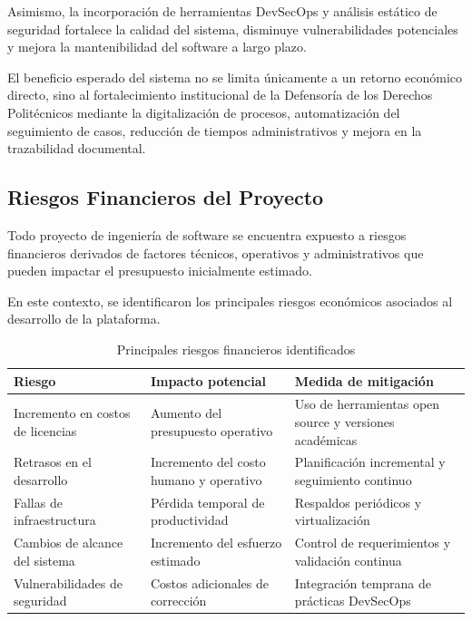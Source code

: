 \documentclass[12pt,oneside,letterpaper]{book}
\begin{document}
Asimismo, la incorporación de herramientas DevSecOps y análisis estático de seguridad fortalece la calidad del sistema, disminuye vulnerabilidades potenciales y mejora la mantenibilidad del software a largo plazo.

El beneficio esperado del sistema no se limita únicamente a un retorno económico directo, sino al fortalecimiento institucional de la Defensoría de los Derechos Politécnicos mediante la digitalización de procesos, automatización del seguimiento de casos, reducción de tiempos administrativos y mejora en la trazabilidad documental.

\vspace{0.5cm}

\subsection{Riesgos Financieros del Proyecto}

Todo proyecto de ingeniería de software se encuentra expuesto a riesgos financieros derivados de factores técnicos, operativos y administrativos que pueden impactar el presupuesto inicialmente estimado.

En este contexto, se identificaron los principales riesgos económicos asociados al desarrollo de la plataforma.

\begin{table}[H]
\centering
\caption{Principales riesgos financieros identificados}

\begin{tabular}{p{5cm} p{5cm} p{4cm}}
\toprule
\rowcolor{headerblue}
\textbf{Riesgo} & \textbf{Impacto potencial} & \textbf{Medida de mitigación} \\
\midrule

Incremento en costos de licencias &
Aumento del presupuesto operativo &
Uso de herramientas open source y versiones académicas \\

Retrasos en el desarrollo &
Incremento del costo humano y operativo &
Planificación incremental y seguimiento continuo \\

Fallas de infraestructura &
Pérdida temporal de productividad &
Respaldos periódicos y virtualización \\

Cambios de alcance del sistema &
Incremento del esfuerzo estimado &
Control de requerimientos y validación continua \\

Vulnerabilidades de seguridad &
Costos adicionales de corrección &
Integración temprana de prácticas DevSecOps \\

\bottomrule
\end{tabular}
\end{table}
\end{document}
